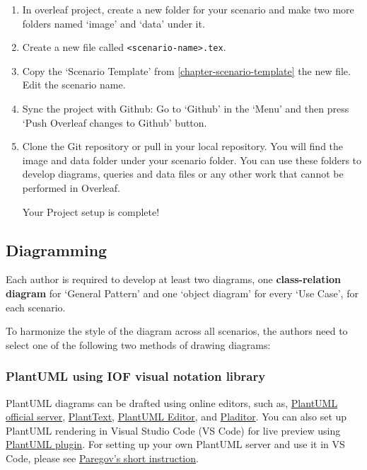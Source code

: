 \begin{enumerate}
    \item In overleaf project, create a new folder for your scenario and make two more folders named `image' and `data' under it.
    \item Create a new file called \texttt{<scenario-name>.tex}. 
    \item Copy the `Scenario Template' from \cref{chapter-scenario-template} the new file. Edit the scenario name.  
    \item Sync the project with Github: Go to `Github' in the `Menu' and then press `Push Overleaf changes to Github' button.
    \item Clone the Git repository or pull in your local repository. You will find the image and data folder under your scenario folder. You can use these folders to develop diagrams, queries and data files or any other work that cannot be performed in Overleaf.

    Your Project setup is complete!
\end{enumerate}

\subsection*{Diagramming}

Each author is required to develop at least two diagrams, one \textbf{class-relation diagram} for `General Pattern' and one `object diagram' for every `Use Case', for each scenario. 

To harmonize the style of the diagram across all scenarios, the authors need to select one of the following two methods of drawing diagrams:

\subsubsection{PlantUML using IOF visual notation library}

PlantUML diagrams can be drafted using online editors, such as, \href{https://www.plantuml.com/plantuml/uml}{PlantUML official server}, \href{https://www.planttext.com/}{PlantText}, \href{https://plantuml-editor.kkeisuke.dev/}{PlantUML Editor}, and \href{https://plantumleditor.com/webedit/}{Pladitor}. You can also set up PlantUML rendering in Visual Studio Code (VS Code) for live preview using \href{https://marketplace.visualstudio.com/items?itemName=jebbs.plantuml}{PlantUML plugin}. For setting up your own PlantUML server and use it in VS Code, please see \href{https://paregov.net/setup-plantuml-with-docker-and-visual-studio-code-locally/}{Paregov's short instruction}.


